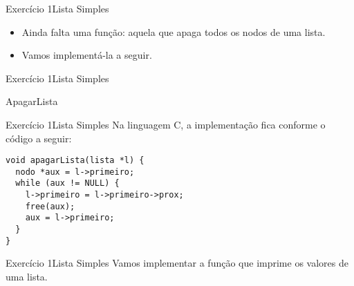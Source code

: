 \documentclass[aspectratio=169]{beamer}
\begin{document}

\begin{frame}[fragile]{Exercício 1}{Lista Simples}
\begin{itemize}
\item Ainda falta uma função: aquela que apaga todos os nodos de uma lista.
\item Vamos implementá-la a seguir.
\end{itemize}
\end{frame}



\begin{frame}[fragile]{Exercício 1}{Lista Simples}
\begin{algorithm}[H]
\caption{ApagarLista} 
\label{ApagarLista}
\end{algorithm}
\end{frame}


\begin{frame}[fragile]{Exercício 1}{Lista Simples}
Na linguagem C, a implementação fica conforme o código a seguir:
\begin{lstlisting}[style=CStyle]
void apagarLista(lista *l) {
  nodo *aux = l->primeiro;
  while (aux != NULL) {
    l->primeiro = l->primeiro->prox;
    free(aux);   
    aux = l->primeiro;
  }
}
\end{lstlisting}  
\end{frame}


\begin{frame}[fragile]{Exercício 1}{Lista Simples}
Vamos implementar a função que imprime os valores de uma lista.
\end{frame}


\end{document}
